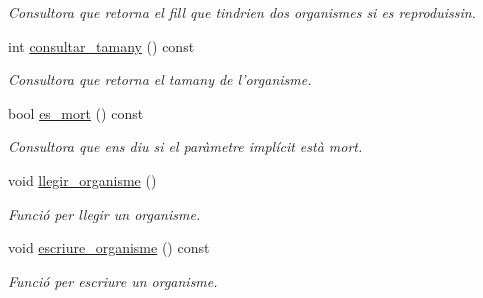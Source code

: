 \begin{DoxyCompactItemize}
\begin{DoxyCompactList}\small\item\em Consultora que retorna el fill que tindrien dos organismes si es reproduissin. \end{DoxyCompactList}\item 
int \hyperlink{class_organisme_a2232a1a2596db03697e6345fff587621}{consultar\-\_\-tamany} () const 
\begin{DoxyCompactList}\small\item\em Consultora que retorna el tamany de l'organisme. \end{DoxyCompactList}\item 
bool \hyperlink{class_organisme_abe3c4923cc5641e48724312bc298c8a9}{es\-\_\-mort} () const 
\begin{DoxyCompactList}\small\item\em Consultora que ens diu si el paràmetre implícit està mort. \end{DoxyCompactList}\item 
void \hyperlink{class_organisme_a056a9402130c7081b608838ba9ef2a30}{llegir\-\_\-organisme} ()
\begin{DoxyCompactList}\small\item\em Funció per llegir un organisme. \end{DoxyCompactList}\item 
void \hyperlink{class_organisme_ab359a3109ec7ff96018bbe08d97043cf}{escriure\-\_\-organisme} () const 
\begin{DoxyCompactList}\small\item\em Funció per escriure un organisme. \end{DoxyCompactList}\end{DoxyCompactItemize}
